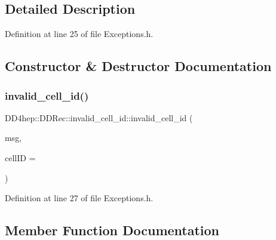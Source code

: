 \subsection{Detailed Description}


Definition at line 25 of file Exceptions.\+h.



\subsection{Constructor \& Destructor Documentation}
\hypertarget{class_d_d4hep_1_1_d_d_rec_1_1invalid__cell__id_a242e8977aced3fb69db5bba5f876fe99}{}\label{class_d_d4hep_1_1_d_d_rec_1_1invalid__cell__id_a242e8977aced3fb69db5bba5f876fe99} 
\subsubsection{\texorpdfstring{invalid\+\_\+cell\+\_\+id()}{invalid\_cell\_id()}}
{\footnotesize\ttfamily D\+D4hep\+::\+D\+D\+Rec\+::invalid\+\_\+cell\+\_\+id\+::invalid\+\_\+cell\+\_\+id (\begin{DoxyParamCaption}\item[{const std\+::string \&}]{msg,  }\item[{const \hyperlink{namespace_d_d4hep_1_1_d_d_segmentation_ac7af071d85cb48820914434a07e21ba1}{D\+D\+Segmentation\+::\+Cell\+ID} \&}]{cell\+ID = {} }\end{DoxyParamCaption})\hspace{0.3cm}{\ttfamily [inline]}}



Definition at line 27 of file Exceptions.\+h.



\subsection{Member Function Documentation}
\hypertarget{class_d_d4hep_1_1_d_d_rec_1_1invalid__cell__id_a62d6a8a99f7edcfe1a506f90640d76a6}{}\label{class_d_d4hep_1_1_d_d_rec_1_1invalid__cell__id_a62d6a8a99f7edcfe1a506f90640d76a6} 
